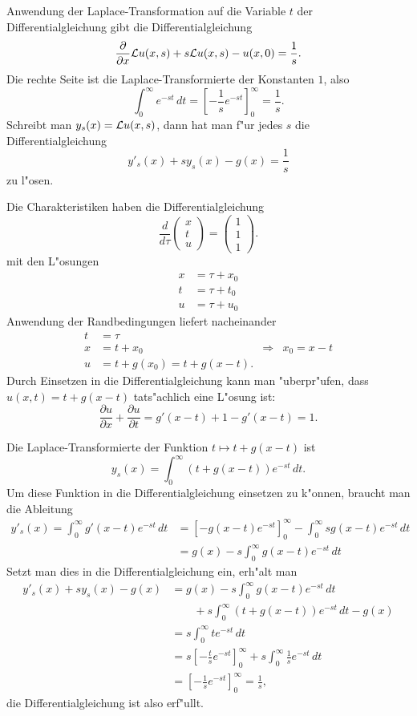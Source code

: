 \begin{loesung}
\begin{teilaufgaben}
\item
Anwendung der Laplace-Transformation auf die Variable $t$ der
Differentialgleichung gibt die Differentialgleichung
\[
\frac{\partial}{\partial x}{\cal L}u(x,s)
+s{\cal L}u(x,s)-u(x,0)=\frac1s.
\]
Die rechte Seite ist die Laplace-Transformierte der Konstanten
$1$, also
\[
\int_0^\infty e^{-st}\,dt
=
\left[
-\frac1s e^{-st}
\right]_0^\infty=\frac1s.
\]
Schreibt man $y_s(x)={\cal L}u(x,s)$, dann hat man
f"ur jedes $s$  die Differentialgleichung
\[
y'_s(x)+sy_s(x)-g(x)=\frac1s
\]
zu l"osen.
\item
Die Charakteristiken haben die Differentialgleichung
\[
\frac{d}{d\tau}\begin{pmatrix}
x\\t\\u
\end{pmatrix}
=\begin{pmatrix}
1\\1\\1
\end{pmatrix}.
\]
mit den L"osungen
\begin{align*}
x&=\tau + x_0\\
t&=\tau + t_0\\
u&=\tau + u_0
\end{align*}
Anwendung der Randbedingungen liefert nacheinander
\begin{align*}
t&=\tau\\
x&=t+x_0
&\Rightarrow&x_0=x-t\\
u&=t+g(x_0)=t+g(x-t).
\end{align*}
Durch Einsetzen in die Differentialgleichung kann man "uberpr"ufen,
dass $u(x,t)=t+g(x-t)$ tats"achlich eine L"osung ist:
\[
\frac{\partial u}{\partial x}+\frac{\partial u}{\partial t}
=
g'(x-t)+1-g'(x-t)=1.
\]
\item
Die Laplace-Transformierte der Funktion $t\mapsto t+g(x-t)$ ist
\[
y_s(x)=\int_0^\infty (t+g(x-t))e^{-st}\,dt.
\]
Um diese Funktion in die Differentialgleichung einsetzen zu k"onnen,
braucht man die Ableitung
\begin{align*}
y'_s(x)=\int_0^\infty g'(x-t)e^{-st}\,dt
&=\left[-g(x-t)e^{-st}\right]_0^\infty
-\int_0^\infty sg(x-t)e^{-st}\,dt
\\
&=g(x)-s\int_0^\infty g(x-t) e^{-st}\,dt
\end{align*}
Setzt man dies in die Differentialgleichung ein, erh"alt man
\begin{align*}
y'_s(x)+sy_s(x)-g(x)&=g(x)-s\int_0^\infty g(x-t)e^{-st}\,dt
\\
&\qquad
+s\int_0^\infty (t+g(x-t)) e^{-st}\,dt-g(x)
\\
&=s\int_0^\infty te^{-st}\,dt
\\
&=s\left[-\frac{t}{s}e^{-st}\right]_0^\infty
+s\int_0^\infty\frac{1}{s}e^{-st}\,dt
\\
&=\left[-\frac1s e^{-st}\right]_0^\infty
=\frac1s,
\end{align*}
die Differentialgleichung ist also erf"ullt.
\qedhere
\end{teilaufgaben}
\end{loesung}
